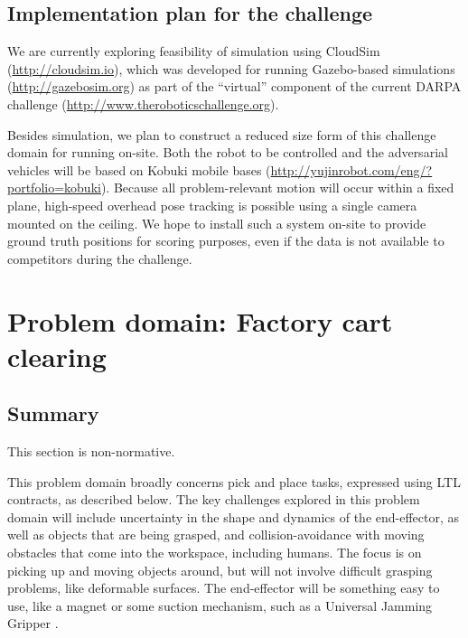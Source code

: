 \documentclass{amsart}
\theoremstyle{definition}
\begin{document}


\subsection{Implementation plan for the challenge}

We are currently exploring feasibility of simulation using CloudSim
(\url{http://cloudsim.io}), which was developed for running Gazebo-based
simulations (\url{http://gazebosim.org}) as part of the ``virtual'' component of
the current DARPA challenge (\url{http://www.theroboticschallenge.org}).

Besides simulation, we plan to construct a reduced size form of this challenge
domain for running on-site.  Both the robot to be controlled and the
adversarial vehicles will be based on Kobuki mobile bases
(\url{http://yujinrobot.com/eng/?portfolio=kobuki}).  Because all
problem-relevant motion will occur within a fixed plane, high-speed overhead
pose tracking is possible using a single camera mounted on the ceiling.  We hope
to install such a system on-site to provide ground truth positions for
scoring purposes, even if the data is not available to competitors during the
challenge.

\section{Problem domain: Factory cart clearing}\label{sec:cartclearing}

\subsection{Summary}

This section is non-normative.\newline

This problem domain broadly concerns pick and place tasks, expressed using LTL
contracts, as described below. The key challenges explored in this problem
domain will include uncertainty in the shape and dynamics of the end-effector,
as well as objects that are being grasped, and collision-avoidance with moving
obstacles that come into the workspace, including humans. The focus is on
picking up and moving objects around, but will not involve difficult grasping
problems, like deformable surfaces. The end-effector will be something easy to
use, like a magnet or some suction mechanism, such as a Universal Jamming
Gripper \cite{AmendBRJL12}.
\end{document}
